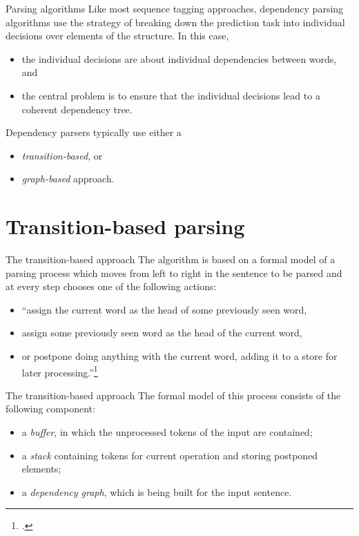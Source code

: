 \documentclass[style=upen, size=14pt]{powerdot}
\newcommand{\gold}{\color{arany}}
\theoremstyle{definition}
\begin{document}
\begin{slide}{Parsing algorithms}
  Like most sequence tagging approaches, dependency parsing algorithms use the
  strategy of breaking down the prediction task into individual decisions over
  elements of the structure. In this case,

  \begin{itemize}
  \item the individual decisions are about individual dependencies between words, and
  \item the central problem is to ensure that the individual decisions lead to a
    coherent dependency tree.
  \end{itemize}
  Dependency parsers typically use either a 
  \begin{itemize}
  \item \emph{\gold transition-based}, or
  \item \emph{\gold graph-based} approach.
  \end{itemize}
\end{slide}

\section{Transition-based parsing}

\begin{slide}[toc=The model]{The transition-based approach}
  The algorithm is based on a formal model of a parsing process which moves from
  left to right in the sentence to be parsed and at every step chooses one of
  the following actions:
  \begin{itemize}
  \item ``assign the current word as the head of some previously seen word,
  \item assign some previously seen word as the head of the current word,
  \item or postpone doing anything with the current word, adding it to a store
    for later processing.''\footnote{\citet[ch. 15]{jurafsky2019speech}.}
  \end{itemize}
\end{slide}

\begin{slide}[toc=]{The transition-based approach}
  The formal model of this process consists of the following component:
  \begin{itemize}
  \item a \emph{\gold buffer}, in which the unprocessed tokens of the input are contained;
  \item a \emph{\gold stack} containing tokens for current operation and storing postponed
    elements;
  \item a \emph{\gold dependency graph}, which is being built for the input
    sentence.
  \end{itemize}
\end{slide}
\end{document}
